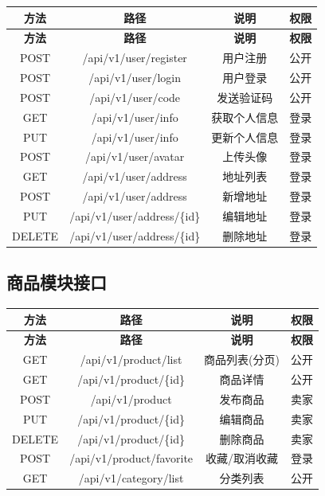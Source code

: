 \documentclass[12pt,a4paper,UTF8]{ctexart}
\begin{document}
\begin{longtable}{|c|c|c|c|}
    \hline
    \textbf{方法} & \textbf{路径} & \textbf{说明} & \textbf{权限} \\
    \hline
    \endfirsthead
    \hline
    \textbf{方法} & \textbf{路径} & \textbf{说明} & \textbf{权限} \\
    \hline
    \endhead
    \hline
    \endfoot

    POST & /api/v1/user/register & 用户注册 & 公开 \\
    \hline
    POST & /api/v1/user/login & 用户登录 & 公开 \\
    \hline
    POST & /api/v1/user/code & 发送验证码 & 公开 \\
    \hline
    GET & /api/v1/user/info & 获取个人信息 & 登录 \\
    \hline
    PUT & /api/v1/user/info & 更新个人信息 & 登录 \\
    \hline
    POST & /api/v1/user/avatar & 上传头像 & 登录 \\
    \hline
    GET & /api/v1/user/address & 地址列表 & 登录 \\
    \hline
    POST & /api/v1/user/address & 新增地址 & 登录 \\
    \hline
    PUT & /api/v1/user/address/\{id\} & 编辑地址 & 登录 \\
    \hline
    DELETE & /api/v1/user/address/\{id\} & 删除地址 & 登录 \\
    \hline
\end{longtable}

\subsection{商品模块接口}

\begin{longtable}{|c|c|c|c|}
    \hline
    \textbf{方法} & \textbf{路径} & \textbf{说明} & \textbf{权限} \\
    \hline
    \endfirsthead
    \hline
    \textbf{方法} & \textbf{路径} & \textbf{说明} & \textbf{权限} \\
    \hline
    \endhead
    \hline
    \endfoot

    GET & /api/v1/product/list & 商品列表(分页) & 公开 \\
    \hline
    GET & /api/v1/product/\{id\} & 商品详情 & 公开 \\
    \hline
    POST & /api/v1/product & 发布商品 & 卖家 \\
    \hline
    PUT & /api/v1/product/\{id\} & 编辑商品 & 卖家 \\
    \hline
    DELETE & /api/v1/product/\{id\} & 删除商品 & 卖家 \\
    \hline
    POST & /api/v1/product/favorite & 收藏/取消收藏 & 登录 \\
    \hline
    GET & /api/v1/category/list & 分类列表 & 公开 \\
    \hline
\end{longtable}
\end{document}

